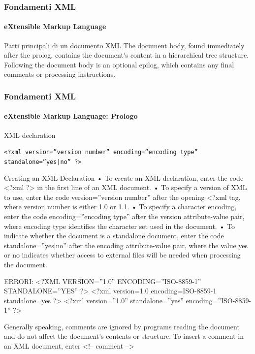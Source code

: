 \begin{frame}
	\frametitle{Fondamenti XML}
	\framesubtitle{eXtensible Markup Language}
	\addtocounter{nframe}{1}

	\begin{block}{Parti principali di un documento XML}
        The document body, found immediately after the prolog, contains the document’s
        content in a hierarchical tree structure. Following the document body is an optional
        e­pilog, which contains any final comments or processing instructions.
	\end{block}

\end{frame}

\begin{frame}
	\frametitle{Fondamenti XML}
	\framesubtitle{eXtensible Markup Language: Prologo}
	\addtocounter{nframe}{1}

	\begin{block}{XML declaration}
    \begin{center}\texttt{<?xml version=”version number” encoding=”encoding type” standalone=”yes|no” ?>}\end{center}
	\end{block}

\end{frame}

Creating an XML Declaration
• To create an XML declaration, enter the code
<?xml ?>
in the first line of an XML document.
• To specify a version of XML to use, enter the code
version=”version number”
after the opening <?xml tag, where version number is either 1.0 or 1.1.
• To specify a character encoding, enter the code
encoding=”encoding type”
after the version attribute-value pair, where encoding type identifies the ­character
set used in the document.
• To indicate whether the document is a standalone document, enter the code
standalone=”yes|no”
after the encoding attribute-value pair, where the value yes or no ­indicates whether
access to external files will be needed when processing the document.


ERRORI:
<?XML VERSION=”1.0” ENCODING=”ISO-8859-1” STANDALONE=”YES” ?>
<?xml version=1.0 encoding=ISO-8859-1 standalone=yes ?>
<?xml version=”1.0” standalone=”yes” encoding=”ISO-8859-1” ?>

Generally speaking, comments are ignored by programs reading the document and
do not affect the document’s contents or structure.
To insert a comment in an XML document, enter
<!-- comment -->

